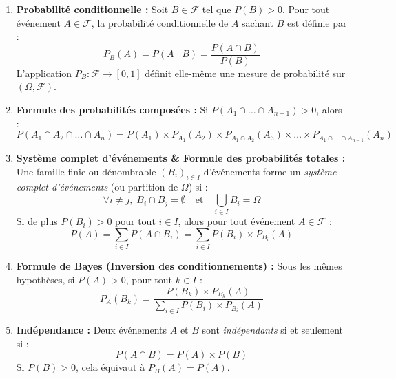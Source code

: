\documentclass[11pt,a4paper]{article}
\begin{document}
\begin{coursbox}
\begin{enumerate}
    \item \textbf{Probabilité conditionnelle :} Soit $B \in \mathscr{F}$ tel que $P(B) > 0$. Pour tout événement $A \in \mathscr{F}$, la probabilité conditionnelle de $A$ sachant $B$ est définie par :
    \[
    P_B(A) = P(A \mid B) = \frac{P(A \cap B)}{P(B)}
    \]
    L'application $P_B : \mathscr{F} \to [0, 1]$ définit elle-même une mesure de probabilité sur $(\Omega, \mathscr{F})$.

    \item \textbf{Formule des probabilités composées :} Si $P(A_1 \cap \dots \cap A_{n-1}) > 0$, alors :
    \[
    P(A_1 \cap A_2 \cap \dots \cap A_n) = P(A_1) \times P_{A_1}(A_2) \times P_{A_1 \cap A_2}(A_3) \times \dots \times P_{A_1 \cap \dots \cap A_{n-1}}(A_n)
    \]

    \item \textbf{Système complet d'événements \& Formule des probabilités totales :}
    Une famille finie ou dénombrable $(B_i)_{i \in I}$ d'événements forme un \emph{système complet d'événements} (ou partition de $\Omega$) si :
    \[
    \forall i \neq j, \; B_i \cap B_j = \emptyset \quad \text{et} \quad \bigcup_{i \in I} B_i = \Omega
    \]
    Si de plus $P(B_i) > 0$ pour tout $i \in I$, alors pour tout événement $A \in \mathscr{F}$ :
    \[
    P(A) = \sum_{i \in I} P(A \cap B_i) = \sum_{i \in I} P(B_i) \times P_{B_i}(A)
    \]

    \item \textbf{Formule de Bayes (Inversion des conditionnements) :}
    Sous les mêmes hypothèses, si $P(A) > 0$, pour tout $k \in I$ :
    \[
    P_A(B_k) = \frac{P(B_k) \times P_{B_k}(A)}{\displaystyle\sum_{i \in I} P(B_i) \times P_{B_i}(A)}
    \]

    \item \textbf{Indépendance :} Deux événements $A$ et $B$ sont \emph{indépendants} si et seulement si :
    \[
    P(A \cap B) = P(A) \times P(B)
    \]
    Si $P(B) > 0$, cela équivaut à $P_B(A) = P(A)$.
\end{enumerate}
\end{coursbox}
\end{document}
